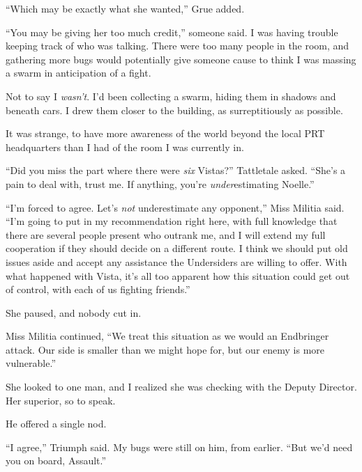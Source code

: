 ``Which may be exactly what she wanted,'' Grue added.



``You may be giving her too much credit,'' someone said.  I was having trouble keeping track of who was talking.  There were too many people in the room, and gathering more bugs would potentially give someone cause to think I was massing a swarm in anticipation of a fight.



Not to say I \emph{wasn't}.  I'd been collecting a swarm, hiding them in shadows and beneath cars.  I drew them closer to the building, as surreptitiously as possible.



It was strange, to have more awareness of the world beyond the local PRT headquarters than I had of the room I was currently in.



``Did you miss the part where there were \emph{six} Vistas?''  Tattletale asked.  ``She's a pain to deal with, trust me.  If anything, you're \emph{under}estimating Noelle.''



``I'm forced to agree.  Let's \emph{not} underestimate any opponent,'' Miss Militia said.  ``I'm going to put in my recommendation right here, with full knowledge that there are several people present who outrank me, and I will extend my full cooperation if they should decide on a different route.  I think we should put old issues aside and accept any assistance the Undersiders are willing to offer.  With what happened with Vista, it's all too apparent how this situation could get out of control, with each of us fighting friends.''



She paused, and nobody cut in.



Miss Militia continued, ``We treat this situation as we would an Endbringer attack.  Our side is smaller than we might hope for, but our enemy is more vulnerable.''



She looked to one man, and I realized she was checking with the Deputy Director.  Her superior, so to speak.



He offered a single nod.



``I agree,'' Triumph said.  My bugs were still on him, from earlier.  ``But we'd need you on board, Assault.''



